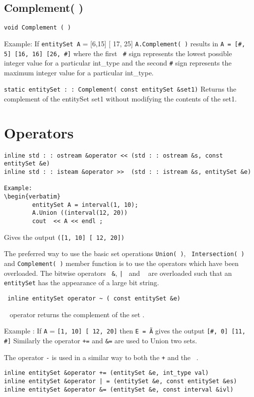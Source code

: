 \documentclass[letterpaper,12pt]{article}
\begin{document}
\subsection{Complement( ) }

{\tt void Complement ( ) }

Example: If {\tt entitySet A} = [6,15] [ 17, 25] {\tt A.Complement( )}
results in {\tt A = [\#, 5] [16, 16] [26, \#]} where the first {\tt
  \#} sign represents the lowest possible integer value for a
particular int\_type and the second {\tt \#} sign represents the maximum
integer value for a particular int\_type.

{\tt static entitySet : : Complement( const entitySet \&set1)}
Returns the complement of the entitySet set1 without modifying the contents of 
the set1.

\section*{Operators}
\begin{verbatim}
inline std : : ostream &operator << (std : : ostream &s, const entitySet &e)
inline std : : isteam &operator >>  (std : : istream &s, entitySet &e)

Example:
\begin{verbatim}
        entitySet A = interval(1, 10);
        A.Union ((interval(12, 20))
        cout  << A << endl ; 
\end{verbatim}

Gives the output {\tt ([1, 10] [ 12, 20])}

The preferred way to use the basic set operations {\tt Union( )}, {\tt
Intersection( )} and  {\tt Complement( )} member function is to use
the operators which have been overloaded. The bitwise operators {\tt
\&}, {\tt | } and {\tt {} } are overloaded such that an 
{\tt entitySet} has the appearance of a large bit string. 

\begin{verbatim}
 inline entitySet operator ~ ( const entitySet &e)
\end{verbatim}
{\tt {} } operator returns the complement of the set .

Example :  
        If {\tt A} = {\tt [1, 10] [ 12, 20]} then 
        {\tt E = \~A} gives the output {\tt [\#, 0] [11, \#]}
 Similarly the operator {\tt +=} and {\tt \&=} are used to Union two sets. 

The operator {\tt -} is used in a similar way to  both the {\tt +} and
the {\tt {} }.
\begin{verbatim}
inline entitySet &operator += (entitySet &e, int_type val)
inline entitySet &operator | = (entitySet &e, const entitySet &es)
inline entitySet &operator &= (entitySet &e, const interval &ivl)
\end{verbatim}
\end{document}
